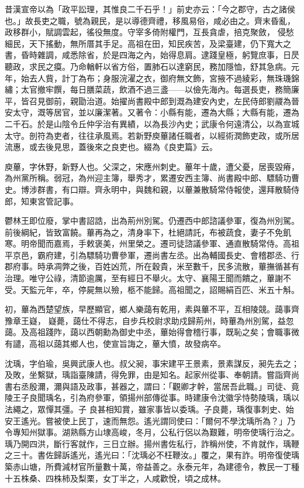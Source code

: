 
\begin{pinyinscope}

 昔漢宣帝以為「政平訟理，其惟良二千石乎！」前史亦云：「今之郡守，古之諸侯也。」故長吏之職，號為親民，是以導德齊禮，移風易俗，咸必由之。齊末昏亂，政移群小，賦調雲起，徭役無度。守宰多倚附權門，互長貪虐，掊克聚斂，
 侵愁細民，天下搖動，無所厝其手足。高祖在田，知民疾苦，及梁臺建，仍下寬大之書，昏時雜調，咸悉除省，於是四海之內，始得息肩。逮踐皇極，躬覽庶事，日昃聽政，求民之瘼。乃命輶軒以省方俗，置肺石以達窮民，務加隱恤，舒其急病。元年，始去人貲，計丁為布；身服浣濯之衣，御府無文飾，宮掖不過綾彩，無珠璣錦繡；太官撤牢饌，每日膳菜蔬，飲酒不過三盞——以儉先海內。每選長吏，務簡廉平，皆召見御前，親勖治道。始擢尚書殿中郎到溉為建安內史，左民侍郎劉鬷為晉安太守，溉等居官，並以廉潔著。又著令：小縣有能，遷為大縣；大縣有能，遷為
 二千石。於是山陰令丘仲孚治有異績，以為長沙內史；武康令何遠清公，以為宣城太守。剖符為吏者，往往承風焉。若新野庾蓽諸任職者，以經術潤飾吏政，或所居流惠，或去後見思，蓋後來之良吏也。綴為《良吏篇》云。



 庾蓽，字休野，新野人也。父深之，宋應州刺史。蓽年十歲，遭父憂，居喪毀瘠，為州黨所稱。弱冠，為州迎主簿，舉秀才，累遷安西主簿、尚書殿中郎、驃騎功曹史。博涉群書，有口辯。齊永明中，與魏和親，以蓽兼散騎常侍報使，還拜散騎侍郎，知東宮管記事。



 鬱林王即位廢，掌中書詔誥，出為荊州別駕。仍遷西中郎諮議參軍，復為州別駕。
 前後綱紀，皆致富饒。蓽再為之，清身率下，杜絕請託，布被蔬食，妻子不免飢寒。明帝聞而嘉焉，手敕褒美，州里榮之。遷司徒諮議參軍、通直散騎常侍。高祖平京邑，霸府建，引為驃騎功曹參軍，遷尚書左丞。出為輔國長史、會稽郡丞、行郡府事。時承凋弊之後，百姓凶荒，所在穀貴，米至數千，民多流散，蓽撫循甚有治理。唯守公祿，清節逾厲，至有經日不舉火。太守、襄陽王聞而饋之，蓽謝不受。天監元年，卒，停屍無以殮，柩不能歸。高祖聞之，詔賜絹百匹、米五十斛。



 初，蓽為西楚望族，早歷顯官，鄉人樂藹有乾用，素與蓽不平，互相陵競。藹事齊豫章王嶷，
 嶷薨，藹仕不得志，自步兵校尉求助戍歸荊州，時蓽為州別駕，益忽藹。及高祖踐阼，藹以西朝勳為御史中丞，蓽始得會稽行事，既恥之矣；會職事微有譴，高祖以藹其鄉人也，使宣旨誨之，蓽大憤，故發病卒。



 沈瑀，字伯瑜，吳興武康人也。叔父昶，事宋建平王景素，景素謀反，昶先去之；及敗，坐繫獄，瑀詣臺陳請，得免罪，由是知名。起家州從事、奉朝請。嘗詣齊尚書右丞殷濔，濔與語及政事，甚器之，謂曰：「觀卿才幹，當居吾此職。」司徒、竟陵王子良聞瑀名，引為府參軍，領揚州部傳從事。時建康令沈徽孚恃勢陵瑀，瑀以法繩之，眾憚其彊。子
 良甚相知賞，雖家事皆以委瑀。子良薨，瑀復事刺史、始安王遙光。嘗被使上民丁，速而無怨。遙光謂同使曰：「爾何不學沈瑀所為？」乃令專知州獄事。湖熟縣方山埭高峻，冬月，公私行侶以為艱難，明帝使瑀行治之。瑀乃開四洪，斷行客就作，三日立辦。揚州書佐私行，詐稱州使，不肯就作，瑀鞭之三十。書佐歸訴遙光，遙光曰：「沈瑀必不枉鞭汝。」覆之，果有詐。明帝復使瑀築赤山塘，所費減材官所量數十萬，帝益善之。永泰元年，為建德令，教民一丁種十五株桑、四株柿及梨栗，女丁半之，人咸歡悅，頃之成林。




\end{pinyinscope}
